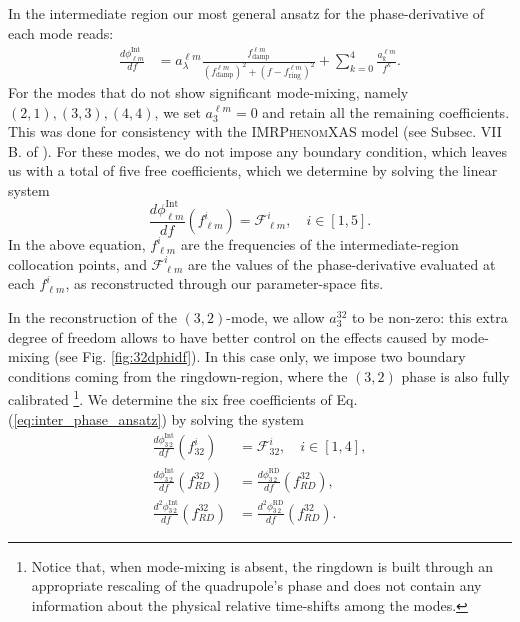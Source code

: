 \documentclass[twocolumn,prd,aps,superscriptaddress,preprintnumbers,tightenlines,showpacs,nofootinbib,eqsecnum,amsfonts,amsmath]{revtex4}
\newcommand{\phX}{\textsc{IMRPhenomXAS}\xspace}
\begin{document}
In the intermediate region our most general ansatz for the phase-derivative of each mode reads:
\begin{align}
\label{eq:inter_phase_ansatz}
\frac{d\phi_{\ell m}^{\mathrm{Int}}}{df}&=a_\lambda^{\ell m}\frac{f_{\mathrm{damp}}^{\ell m}}{(f_{\mathrm{damp}}^{\ell m})^2+(f-f_{\mathrm{ring}}^{\ell m})^2}+\sum_{k=0}^{4}\frac{a_k^{\ell m}}{f^{k}}.
\end{align}
For the modes that do not show significant mode-mixing, namely $(2,1),(3,3),(4,4)$, we set $a_{3}^{\ell m}=0$ and retain all the remaining coefficients. This was done for consistency with the \phX model (see Subsec. VII B. of \cite{phenX}). For these modes, we do not impose any boundary condition, which leaves us with a total of five free coefficients, which we determine by solving the linear system
\begin{equation}
\frac{d\phi_{\ell m}^{\mathrm{Int}}}{df}(f_{\ell m}^{i})=\mathcal{F}^{i}_{\ell m}, \quad i \in\left[1,5\right].
\end{equation}
In the above equation, $f_{\ell m}^{i}$ are the frequencies of the intermediate-region collocation points, and $\mathcal{F}^{i}_{\ell m}$ are the values of the phase-derivative evaluated at each $f_{\ell m}^{i}$, as reconstructed through our parameter-space fits. 

In the reconstruction of the $(3,2)$-mode, we allow $a_{3}^{32}$ to be non-zero: this extra degree of freedom allows to have better control on the effects caused by mode-mixing (see Fig. \ref{fig:32dphidf}). In this case only, we impose two boundary conditions coming from the ringdown-region, where the $(3,2)$ phase is also fully calibrated \footnote{Notice that, when mode-mixing is absent, the ringdown is built through an appropriate rescaling of the quadrupole's phase and does not contain any information about the physical relative time-shifts among the modes.}. We determine the six free coefficients of Eq.\,(\ref{eq:inter_phase_ansatz}) by solving the system
\begin{align}
\frac{d\phi_{3\,2}^{\mathrm{Int}}}{df}(f_{32}^{i})&=\mathcal{F}^{i}_{32}, \quad i \in\left[1,4\right], \nonumber \\
\frac{d\phi_{3\,2}^{\mathrm{Int}}}{df}(f_{RD}^{32})&=\frac{d\phi_{3\,2}^{\mathrm{RD}}}{df}(f_{RD}^{32}), \nonumber \\
\frac{d^2\phi_{3\,2}^{\mathrm{Int}}}{df}(f_{RD}^{32})&=\frac{d^2\phi_{3\,2}^{\mathrm{RD}}}{df}(f_{RD}^{32}) .
\end{align}
\end{document}
